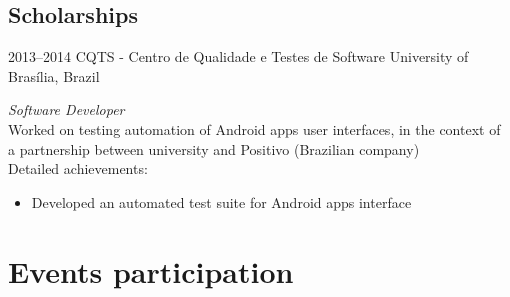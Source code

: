 \documentclass[print]{friggeri-cv}
\begin{document}
\subsection{Scholarships}

\begin{entrylist}

\entry
{2013--2014}
{CQTS - Centro de Qualidade e Testes de Software}
{University of Brasília, Brazil}
{\emph{Software Developer} \\
  Worked on testing automation of Android apps user interfaces, in the
  context of a partnership between university and Positivo (Brazilian company) \\
Detailed achievements:
\begin{itemize}
  \item Developed an automated test suite for Android apps interface
\end{itemize}}

\end{entrylist}

\section{Events participation}
\end{document}
